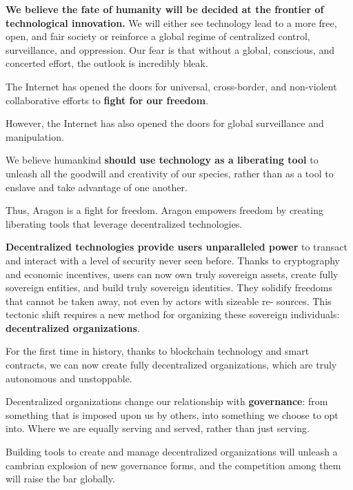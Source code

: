 
\label{chap:AragonManifesto}

\textbf{We believe the fate of humanity will be decided at the frontier of technological innovation.} 
We will either see technology lead to a more free, open, and fair society or reinforce a global regime of centralized control, surveillance, and oppression. Our fear is that without a global, conscious, and concerted effort, the outlook is incredibly bleak.

The Internet has opened the doors for universal, cross-border, and non-violent collaborative efforts to \textbf{fight for our freedom}.

However, the Internet has also opened the doors for global surveillance and manipulation.

We believe humankind \textbf{should use technology as a liberating tool} to unleash all the goodwill and creativity of our species, rather than as a tool to enslave and take advantage of one another.

Thus, Aragon is a fight for freedom. Aragon empowers freedom by creating liberating tools that leverage decentralized technologies.

\textbf{Decentralized technologies provide users unparalleled power} to transact and interact with a level of security never seen before. Thanks to cryptography and economic incentives, users can now own truly sovereign assets, create fully sovereign entities, and build truly sovereign identities. They solidify freedoms that cannot be taken away, not even by actors with sizeable re- sources. This tectonic shift requires a new method for organizing these sovereign individuals: \textbf{decentralized organizations}.

For the first time in history, thanks to blockchain technology and smart contracts, we can now create fully decentralized organizations, which are truly autonomous and unstoppable.

Decentralized organizations change our relationship with \textbf{governance}: from something that is imposed upon us by others, into something we choose to opt into. 
Where we are equally serving and served, rather than just serving.

Building tools to create and manage decentralized organizations will unleash a cambrian explosion of new governance forms, and the competition among them will raise the bar globally.

